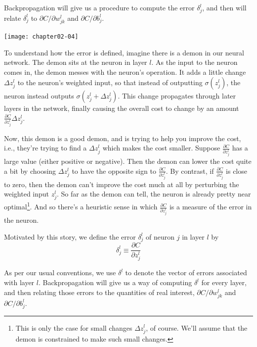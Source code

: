Backpropagation will give us a procedure to compute the error $\delta^{l}_j$, and then will relate $\delta_{j}^{l}$ to $\partial C / \partial w_{j k}^{l}$ and $\partial C / \partial b_{j}^{l}$.

\begin{marginfigure}
\texttt{[image: chapter02-04]}
\end{marginfigure}

To understand how the error is defined, imagine there is a demon in our neural network.
The demon sits at the  neuron in layer $l$. As the input to the neuron comes in, the demon messes with the neuron's operation. It adds a little change $\Delta z_{j}^{l}$ to the neuron's weighted input, so that instead of outputting $\sigma\left(z_{j}^{l}\right)$, the neuron instead outputs $\sigma\left(z_{j}^{l}+\Delta z_{j}^{l}\right)$. This change propagates through later layers in the network, finally causing the overall cost to change by an amount $\frac{\partial C}{\partial z_{j}^{l}} \Delta z_{j}^{l}$.

Now, this demon is a good demon, and is trying to help you improve the cost, i.e., they're trying to find a $\Delta z_{j}^{l}$
which makes the cost smaller. Suppose $\frac{\partial C}{\partial z_{j}^{l}}$ has a large value (either positive or negative). Then the demon can lower the cost quite a bit by choosing $\Delta z_{j}^{l}$ to have the opposite sign to $\frac{\partial C}{\partial z_{j}^{l}}$. By contrast, if $\frac{\partial C}{\partial z_{j}^{l}}$ is close to zero, then the demon can't improve the cost much at all by perturbing the weighted input $ z_{j}^{l}$. So far as the demon can tell, the neuron is already pretty near optimal\footnote{This is only the case for small changes $\Delta z_{j}^{l}$, of course. We'll assume that the demon is constrained to make such small changes.}. And so there's a heuristic sense in which $\frac{\partial C}{\partial z_{j}^{l}}$
is a measure of the error in the neuron.

Motivated by this story, we define the error $\delta_{j}^{l}$ of neuron $j$ in layer $l$ by 
\begin{equation}
\delta_{j}^{l} \equiv \frac{\partial C}{\partial z_{j}^{l}}
\label{eq:c02-29}
\end{equation}

As per our usual conventions, we use $\delta^{l}$ to denote the vector of errors associated with layer $l$. Backpropagation will give us a way of computing  $\delta^{l}$  for every layer, and then relating those errors to the quantities of real interest, $\partial C / \partial w_{j k}^{l}$ and $\partial C / \partial b_{j}^{l}$.

